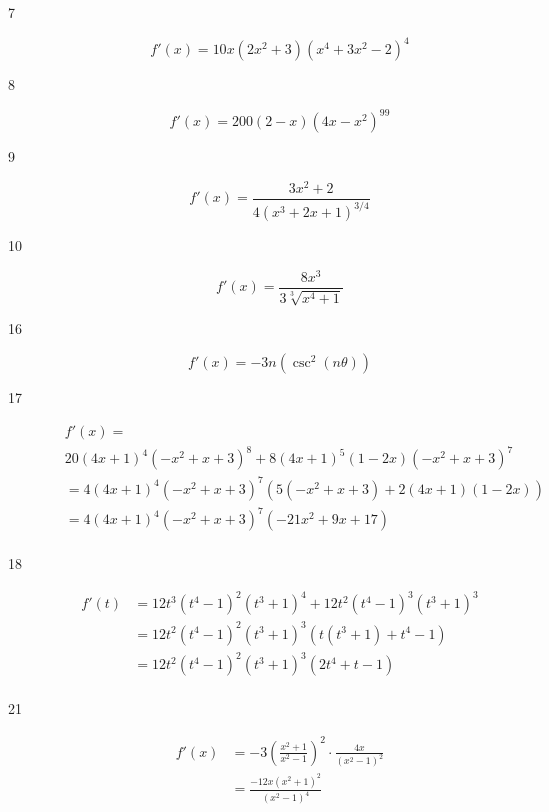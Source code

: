 \documentclass[letterpaper, landscape]{exam}
\begin{document}
\begin{description}
    \item[7] 
      \[
        f'(x) = \boxed{ 10x \left(2x^2 + 3 \right) \left(x^4 + 3x^2 - 2 \right)^4 }
      \]

    \item[8] 
      \[
        f'(x) = \boxed{ 200 \left( 2 - x \right) \left( 4x - x^2 \right)^{99} } 
      \]

    \item[9] 
      \[
        f'(x) = \boxed{ \frac{3x^2 + 2}{4 \left(x^3 + 2x + 1 \right)^{3/4}} }
      \]

    \item[10] 
      \[
        f'(x) = \boxed{ \frac{8x^3}{3 \sqrt[3]{x^4 + 1}} }
      \]

    \item[16] 
      \[
        f'(x) = \boxed{ - 3n \left( \csc ^2 (n \theta) \right) }
      \]

    \item[17] 
      \begin{align*}
         & f'(x) = \\
         & 20 (4x + 1)^4 \left( - x^2 + x + 3\right)^8 + 8 (4x + 1)^5 (1 - 2x) \left( - x^2 + x + 3\right)^7 \\
         & = 4 (4x + 1)^4 \left( - x^2 + x + 3\right)^7 \left( 5 \left( - x^2 + x + 3\right) + 2(4x + 1)(1 - 2x) \right) \\
         & = \boxed{ 4 (4x + 1)^4 \left( - x^2 + x + 3\right)^7 \left( - 21x^2 + 9x + 17 \right) } \\
      \end{align*}

    \item[18] 
      \begin{align*}
        f'(t) & = 12 t^3 \left(t^4 - 1\right)^2 \left(t^3 + 1\right)^4 + 12 t^2 \left(t^4 - 1\right)^3 \left(t^3 + 1\right)^3 \\
              & = 12 t^2 \left(t^4 - 1\right)^2 \left(t^3 + 1\right)^3 \left( t \left( t^3 + 1 \right) + t^4 - 1 \right) \\
              & = \boxed{ 12 t^2 \left(t^4 - 1\right)^2 \left(t^3 + 1\right)^3 \left( 2t^4 + t - 1 \right) } \\
      \end{align*}

    \item[21] 
      \begin{align*}
        f'(x) & = -3 \left( \frac{x^2 + 1}{x^2 - 1} \right)^2 \cdot \frac{4x}{\left(x^2-1\right)^2}  \\
              & = \boxed{ \frac{-12x \left( x^2 + 1 \right)^2}{\left( x^2 - 1 \right)^4} } \\
      \end{align*}


\end{description}
\end{document}
